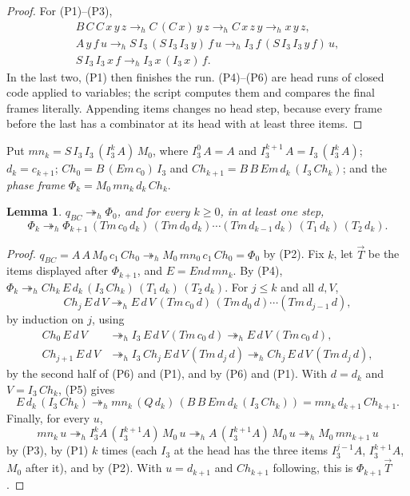 \documentclass[11pt]{amsart}
\newtheorem{lemma}[theorem]{Lemma}
\theoremstyle{definition}
\newcommand{\hred}{\twoheadrightarrow_h}
\newcommand{\hstep}{\to_h}
\newcommand{\qBC}{q_{BC}}
\newcommand{\Ir}{I_3}
\newcommand{\Em}{\mathit{Em}}
\newcommand{\End}{\mathit{End}}
\newcommand{\Mz}{M_0}
\newcommand{\Tem}{\mathit{Tm}}
\newcommand{\Ch}{\mathit{Ch}}
\newcommand{\mn}{\mathit{mn}}
\begin{document}
\begin{proof}
For (P1)--(P3),
\begin{gather*}
B\,C\,C\,x\,y\,z\hstep C\,(C\,x)\,y\,z\hstep C\,x\,z\,y\hstep x\,y\,z,\\
A\,y\,f\,u\hstep S\,\Ir\,(S\,\Ir\,\Ir\,y)\,f\,u\hstep\Ir\,f\,(S\,\Ir\,\Ir\,y\,f)\,u,\\
S\,\Ir\,\Ir\,x\,f\hstep\Ir\,x\,(\Ir\,x)\,f.
\end{gather*}
In the last two, (P1) then finishes the run. (P4)--(P6) are head runs of closed code applied to
variables; the script computes them and compares the final frames literally. Appending items changes
no head step, because every frame before the last has a combinator at its head with at least three
items.
\end{proof}

Put $\mn_k=S\,\Ir\,\Ir\,(\Ir^k\,A)\,\Mz$, where $\Ir^0\,A=A$ and $\Ir^{k+1}\,A=\Ir\,(\Ir^k\,A)$; $d_k=c_{k+1}$;
$\Ch_0=B\,(\Em\,c_0)\,\Ir$ and $\Ch_{k+1}=B\,B\,\Em\,d_k\,(\Ir\,\Ch_k)$; and the \emph{phase frame}
$\Phi_k=\Mz\,\mn_k\,d_k\,\Ch_k$.

\begin{lemma}\label{lem:phase}
$\qBC\hred\Phi_0$, and for every $k\ge0$, in at least one step,
\[
\Phi_k\hred\Phi_{k+1}\,(\Tem\,c_0\,d_k)\,(\Tem\,d_0\,d_k)\cdots(\Tem\,d_{k-1}\,d_k)\,(T_1\,d_k)\,(T_2\,d_k).
\]
\end{lemma}

\begin{proof}
$\qBC=A\,A\,\Mz\,c_1\,\Ch_0\hred\Mz\,\mn_0\,c_1\,\Ch_0=\Phi_0$ by (P2). Fix $k$, let $\vec T$ be the items
displayed after $\Phi_{k+1}$, and $E=\End\,\mn_k$. By (P4),
$\Phi_k\hred\Ch_k\,E\,d_k\,(\Ir\,\Ch_k)\,(T_1\,d_k)\,(T_2\,d_k)$. For $j\le k$ and all $d,V$,
\[
\Ch_j\,E\,d\,V\hred E\,d\,V\,(\Tem\,c_0\,d)\,(\Tem\,d_0\,d)\cdots(\Tem\,d_{j-1}\,d),
\]
by induction on $j$, using
\begin{align*}
\Ch_0\,E\,d\,V&\hred\Ir\,E\,d\,V\,(\Tem\,c_0\,d)\hred E\,d\,V\,(\Tem\,c_0\,d),\\
\Ch_{j+1}\,E\,d\,V&\hred\Ir\,\Ch_j\,E\,d\,V\,(\Tem\,d_j\,d)\hred\Ch_j\,E\,d\,V\,(\Tem\,d_j\,d),
\end{align*}
by the second half of (P6) and (P1), and by (P6) and (P1). With $d=d_k$ and $V=\Ir\,\Ch_k$, (P5) gives
\[
E\,d_k\,(\Ir\,\Ch_k)\hred\mn_k\,(Q\,d_k)\,(B\,B\,\Em\,d_k\,(\Ir\,\Ch_k))=\mn_k\,d_{k+1}\,\Ch_{k+1}.
\]
Finally, for every $u$,
\[
\mn_k\,u\hred\Ir^k A\,(\Ir^{k+1}A)\,\Mz\,u\hred A\,(\Ir^{k+1}A)\,\Mz\,u\hred\Mz\,\mn_{k+1}\,u
\]
by (P3), by (P1) $k$ times (each $\Ir$ at the head has the three items $\Ir^{j-1}A$, $\Ir^{k+1}A$, $\Mz$
after it), and by (P2). With $u=d_{k+1}$ and $\Ch_{k+1}$ following, this is $\Phi_{k+1}\,\vec T$.
\end{proof}
\end{document}
